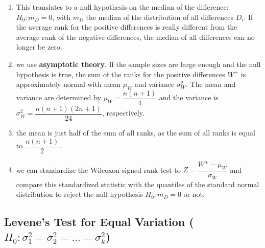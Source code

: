 \begin{enumerate}
    \item This translates to a null hypothesis on the median of the difference: $H_0 : m_ D = 0$, with $m_ D$ the median of the distribution of all differences $D_i $. 
    If the average rank for the positive differences is really different from the average rank of the negative differences, the median of all differences can no longer be zero.
    \hfill \cite{statistics/book/Statistics-for-Data-Scientists/Maurits-Kaptein}

    \item we use \textbf{asymptotic theory}. 
    If the sample sizes are large enough and the null hypothesis is true, the sum of the ranks for the positive differences $W^+$ is approximately normal with mean $\mu_W$ and variance $\sigma^2_W $. 
    The mean and variance are determined by $\mu_W = \dfrac{n(n + 1)}{4}$ and the variance is $\sigma^2 _W = \dfrac{n(n + 1)(2n + 1)}{24}$, respectively. 
    \hfill \cite{statistics/book/Statistics-for-Data-Scientists/Maurits-Kaptein}

    \item the mean is just half of the sum of all ranks, as the sum of all ranks is equal to $\dfrac{n(n + 1)}{2}$. 
    \hfill \cite{statistics/book/Statistics-for-Data-Scientists/Maurits-Kaptein}

    \item we can standardize the Wilcoxon signed rank test to $Z = \dfrac{W^+ - \mu_W }{\sigma_W}$ and compare this standardized statistic with the quantiles of the standard normal distribution to reject the null hypothesis $H_0 : m_ D = 0$ or not.
    \hfill \cite{statistics/book/Statistics-for-Data-Scientists/Maurits-Kaptein}
\end{enumerate}



\subsection{Levene’s Test for Equal Variation ($H_0: \sigma_1^2 = \sigma_2^2 = ... = \sigma_k^2$)}


